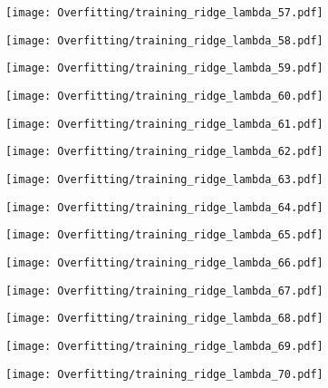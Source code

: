 \documentclass[xcolor=pdftex,dvipsnames,table]{beamer}
\begin{document}
\frame
{
	\begin{center}
		\texttt{[image: Overfitting/training\_ridge\_lambda\_57.pdf]}
	\end{center}
}
\frame
{
	\begin{center}
		\texttt{[image: Overfitting/training\_ridge\_lambda\_58.pdf]}
	\end{center}
}
\frame
{
	\begin{center}
		\texttt{[image: Overfitting/training\_ridge\_lambda\_59.pdf]}
	\end{center}
}
\frame
{
	\begin{center}
		\texttt{[image: Overfitting/training\_ridge\_lambda\_60.pdf]}
	\end{center}
}
\frame
{
	\begin{center}
		\texttt{[image: Overfitting/training\_ridge\_lambda\_61.pdf]}
	\end{center}
}
\frame
{
	\begin{center}
		\texttt{[image: Overfitting/training\_ridge\_lambda\_62.pdf]}
	\end{center}
}
\frame
{
	\begin{center}
		\texttt{[image: Overfitting/training\_ridge\_lambda\_63.pdf]}
	\end{center}
}
\frame
{
	\begin{center}
		\texttt{[image: Overfitting/training\_ridge\_lambda\_64.pdf]}
	\end{center}
}
\frame
{
	\begin{center}
		\texttt{[image: Overfitting/training\_ridge\_lambda\_65.pdf]}
	\end{center}
}
\frame
{
	\begin{center}
		\texttt{[image: Overfitting/training\_ridge\_lambda\_66.pdf]}
	\end{center}
}
\frame
{
	\begin{center}
		\texttt{[image: Overfitting/training\_ridge\_lambda\_67.pdf]}
	\end{center}
}
\frame
{
	\begin{center}
		\texttt{[image: Overfitting/training\_ridge\_lambda\_68.pdf]}
	\end{center}
}
\frame
{
	\begin{center}
		\texttt{[image: Overfitting/training\_ridge\_lambda\_69.pdf]}
	\end{center}
}
\frame
{
	\begin{center}
		\texttt{[image: Overfitting/training\_ridge\_lambda\_70.pdf]}
	\end{center}
}
\end{document}

